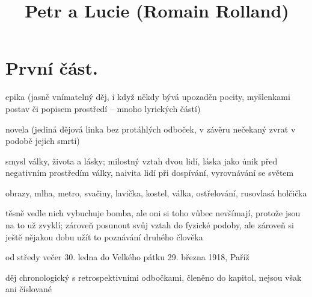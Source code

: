 \documentclass{article}
\title{\vspace{-2cm}Petr a Lucie (Romain Rolland)\vspace{-2cm}}
\date{}
\author{}
\begin{document}
\maketitle
\section{První část.}
\begin{description}
    \setlength\itemsep{0.15em}
    \item[druh:] epika (jasně vnímatelný děj, i když někdy bývá upozaděn pocity, myšlenkami postav či popisem prostředí -- mnoho lyrických částí)
    \item[žánr:] novela (jediná dějová linka bez protáhlých odboček, v závěru nečekaný zvrat v podobě jejich smrti)
    \item[téma:] smysl války, života a lásky; milostný vztah dvou lidí, láska jako únik před negativním prostředím války, naivita lidí při dospívání, vyrovnávání se světem
    \item[motivy:] obrazy, mlha, metro, svačiny, lavička, kostel, válka, ostřelování, rusovlasá holčička
    \item[zařazení výňatku do kontextu díla:] těsně vedle nich vybuchuje bomba, ale oni si toho vůbec nevšímají, protože jsou na to už zvyklí; zároveň posunout svůj vztah do fyzické podoby, ale zároveň si ještě nějakou dobu užít to poznávání druhého člověka
    \item[časoprostor:] od středy večer 30. ledna do Velkého pátku 29. března 1918, Paříž
    \item[kompoziční výstavba:] děj chronologický s retrospektivními odbočkami, členěno do kapitol, nejsou však ani číslované
\end{description}
\end{document}
